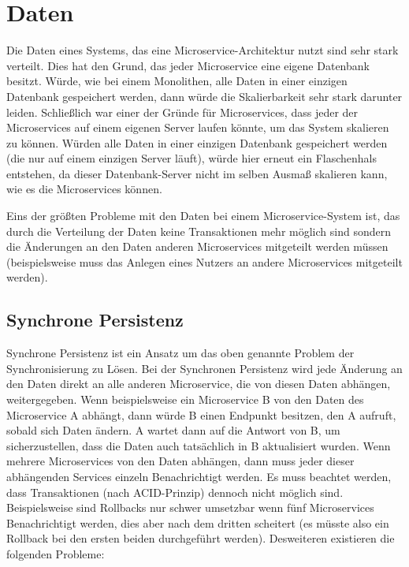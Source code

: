 
\section{Daten}

Die Daten eines Systems, das eine Microservice-Architektur nutzt sind sehr stark verteilt. Dies hat den Grund, das jeder Microservice eine eigene Datenbank besitzt. Würde, wie bei einem Monolithen, alle Daten in einer einzigen Datenbank gespeichert werden, dann würde die Skalierbarkeit sehr stark darunter leiden. Schließlich war einer der Gründe für Microservices, dass jeder der Microservices auf einem eigenen Server laufen könnte, um das System skalieren zu können. Würden alle Daten in einer einzigen Datenbank gespeichert werden (die nur auf einem einzigen Server läuft), würde hier erneut ein Flaschenhals entstehen, da dieser Datenbank-Server nicht im selben Ausmaß skalieren kann, wie es die Microservices können.

Eins der größten Probleme mit den Daten bei einem Microservice-System ist, das durch die Verteilung der Daten keine Transaktionen mehr möglich sind sondern die Änderungen an den Daten anderen Microservices mitgeteilt werden müssen (beispielsweise muss das Anlegen eines Nutzers an andere Microservices mitgeteilt werden).

\subsection{Synchrone Persistenz}

Synchrone Persistenz ist ein Ansatz um das oben genannte Problem der Synchronisierung zu Lösen. Bei der Synchronen Persistenz wird jede Änderung an den Daten direkt an alle anderen Microservice, die von diesen Daten abhängen, weitergegeben. Wenn beispielsweise ein Microservice B von den Daten des Microservice A abhängt, dann würde B einen Endpunkt besitzen, den A aufruft, sobald sich Daten ändern. A wartet dann auf die Antwort von B, um sicherzustellen, dass die Daten auch tatsächlich in B aktualisiert wurden. Wenn mehrere Microservices von den Daten abhängen, dann muss jeder dieser abhängenden Services einzeln Benachrichtigt werden. Es muss beachtet werden, dass Transaktionen (nach ACID-Prinzip) dennoch nicht möglich sind. Beispielsweise sind Rollbacks nur schwer umsetzbar wenn fünf Microservices Benachrichtigt werden, dies aber nach dem dritten scheitert (es müsste also ein Rollback bei den ersten beiden durchgeführt werden). Desweiteren existieren die folgenden Probleme:

